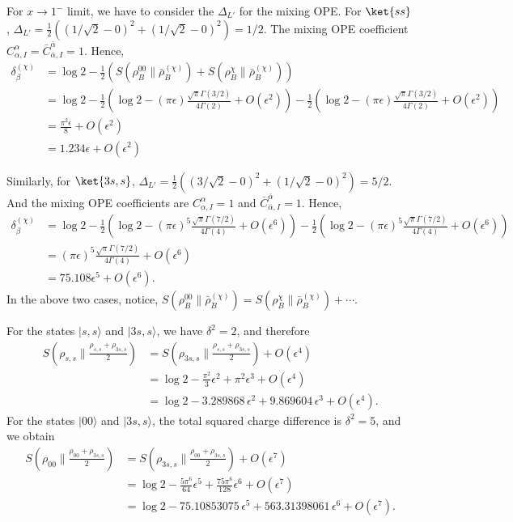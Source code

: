 \documentclass[11pt]{article}
\newcommand{\ep}{\epsilon}
\newcommand{\nn}{\nonumber}
\newcommand{\lb}{\left(}
\newcommand{\rb}{\right)}
\begin{document}
For $x \to 1^-$ limit, we have to consider the $\Delta_{L'}$ for the mixing OPE. For $\ket{ss}$, $\Delta_{L'} = \frac{1}{2}\lb \lb 1/\sqrt{2} -0\rb^2 + \lb 1/\sqrt{2} -0\rb^2 \rb= 1/2$. The mixing OPE coefficient $C_{\alpha ,I}^\alpha = \bar C_{\bar \alpha, I}^{\bar \alpha} = 1$. Hence, 
\begin{align}
    \delta_\beta^{(\chi)} &= \log 2 - \frac{1}{2}\lb S(\rho_B^{00} \| \bar \rho^{(\chi)}_B  ) + S(\rho^\chi_B \| \bar \rho ^{(\chi)}_B)   \rb  \\&= \log 2 - \frac{1}{2}\lb \log 2 - (\pi \ep) \frac{\sqrt{\pi} \Gamma(3/2)}{4\Gamma(2)} + O(\ep^2)\rb - \frac{1}{2}\lb  \log 2 - (\pi \ep) \frac{\sqrt{\pi} \Gamma(3/2)}{4\Gamma(2)}+ O(\ep^2)\rb \\
    &= \frac{\pi^2\ep}{8} + O(\ep^2)\\
    &= 1.234 \ep+ O(\ep^2) 
\end{align}


Similarly, for $\ket{3s,s}$,
$\Delta_{L'} = \frac{1}{2}\lb\left(3/\sqrt{2}-0\right)^2
+ \left(1/\sqrt{2}-0\right)^2\rb = 5/2$.
And the mixing OPE coefficients are
$C_{\alpha,I}^{\alpha}=1$ and
$\bar{C}_{\bar{\alpha},I}^{\bar{\alpha}}=1$.
Hence,
\begin{align}
    \delta_\beta^{(\chi)}  &= \log 2 - \frac{1}{2}\lb \log 2 - (\pi \ep)^{5}\frac{\sqrt{\pi}\Gamma(7/2)}{4\Gamma(4)} + O(\ep^6)\rb - \frac{1}{2}\lb  \log 2 - (\pi \ep)^{5}\frac{\sqrt{\pi}\Gamma(7/2)}{4\Gamma(4)}+ O(\ep^6)\rb  \\
    &=(\pi \ep)^{5}\frac{\sqrt{\pi}\Gamma(7/2)}{4\Gamma(4)}+ O(\ep^6) \\
    &= 75.108 \ep^{5} + O(\ep^6).
\end{align}
In the above two cases, notice, $S(\rho_B^{00} \| \bar \rho^{(\chi)}_B  ) = S(\rho^\chi_B \| \bar \rho ^{(\chi)}_B) + \cdots$.


For the states $|s,s\rangle$ and $|3s,s\rangle$, we have $\delta^2=2$, and therefore
\begin{align}
    S\lb
    \rho_{s,s}
    \Big\|
    \frac{\rho_{s,s}+\rho_{3s,s}}{2}
    \rb
    &=
    S\lb
    \rho_{3s,s}
    \Big\|
    \frac{\rho_{s,s}+\rho_{3s,s}}{2}
    \rb
    +O(\ep^4)
    \nn\\
    &=
    \log 2
    -
    \frac{\pi^2}{3}\ep^2
    +
    \pi^2\ep^3
    +O(\ep^4)
    \nn\\
    &=
    \log 2
    -
    3.289868\,\ep^2
    +
    9.869604\,\ep^3
    +O(\ep^4).
\end{align}
For the states $|00\rangle$ and $|3s,s\rangle$, the total squared charge difference is
$\delta^2=5$, and we obtain
\begin{align}
    S\lb
    \rho_{00}
    \Big\|
    \frac{\rho_{00}+\rho_{3s,s}}{2}
    \rb
    &=
    S\lb
    \rho_{3s,s}
    \Big\|
    \frac{\rho_{00}+\rho_{3s,s}}{2}
    \rb
    +O(\ep^7)
    \nn\\
    &=
    \log 2
    -
    \frac{5\pi^6}{64}\ep^5
    +
    \frac{75\pi^6}{128}\ep^6
    +O(\ep^7)
    \nn\\
    &=
    \log 2
    -
    75.10853075\,\ep^5
    +
    563.31398061\,\ep^6
    +O(\ep^7).
\end{align}
\end{document}
